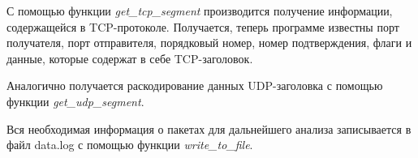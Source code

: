 \documentclass[bachelor, och, coursework]{SCWorks}
\begin{document}
    С помощью функции \textit{get\_tcp\_segment} производится получение информации, содержащейся в TCP-протоколе. Получается,
    теперь программе известны порт получателя, порт отправителя, порядковый номер, номер подтверждения, флаги и данные, которые
    содержат в себе TCP-заголовок.

    

   Аналогично получается раскодирование данных UDP-заголовка с помощью функции \textit{get\_udp\_segment}.


    Вся необходимая информация о пакетах для дальнейшего анализа записывается в файл data.log с помощью функции \textit{write\_to\_file}.
    
\end{document}
